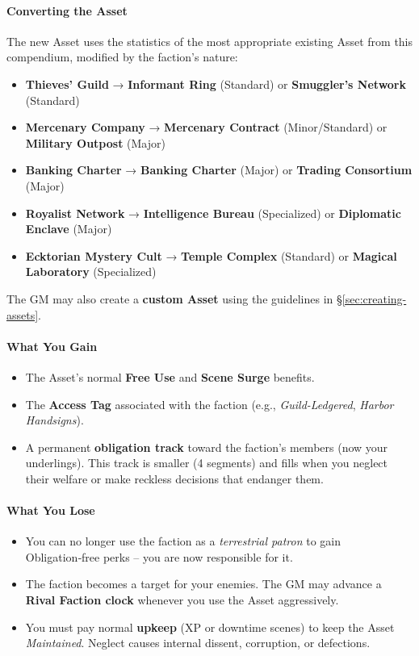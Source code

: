 \begin{tcolorbox}[colback=black!3!white,colframe=black!60!white,title={From Faction to Asset: Taking Over a Terrestrial Patron}]
\paragraph{Converting the Asset}
The new Asset uses the statistics of the most appropriate existing Asset from this compendium, modified by the faction’s nature:
\begin{itemize}
  \item \textbf{Thieves’ Guild} → \textbf{Informant Ring} (Standard) or \textbf{Smuggler’s Network} (Standard)
  \item \textbf{Mercenary Company} → \textbf{Mercenary Contract} (Minor/Standard) or \textbf{Military Outpost} (Major)
  \item \textbf{Banking Charter} → \textbf{Banking Charter} (Major) or \textbf{Trading Consortium} (Major)
  \item \textbf{Royalist Network} → \textbf{Intelligence Bureau} (Specialized) or \textbf{Diplomatic Enclave} (Major)
  \item \textbf{Ecktorian Mystery Cult} → \textbf{Temple Complex} (Standard) or \textbf{Magical Laboratory} (Specialized)
\end{itemize}
The GM may also create a \textbf{custom Asset} using the guidelines in \S\ref{sec:creating-assets}.

\paragraph{What You Gain}
\begin{itemize}
  \item The Asset’s normal \textbf{Free Use} and \textbf{Scene Surge} benefits.
  \item The \textbf{Access Tag} associated with the faction (e.g., \textit{Guild-Ledgered}, \textit{Harbor Handsigns}).
  \item A permanent \textbf{obligation track} toward the faction’s members (now your underlings). This track is smaller (4 segments) and fills when you neglect their welfare or make reckless decisions that endanger them.
\end{itemize}

\paragraph{What You Lose}
\begin{itemize}
  \item You can no longer use the faction as a \emph{terrestrial patron} to gain Obligation‑free perks – you are now responsible for it.
  \item The faction becomes a target for your enemies. The GM may advance a \textbf{Rival Faction clock} whenever you use the Asset aggressively.
  \item You must pay normal \textbf{upkeep} (XP or downtime scenes) to keep the Asset \emph{Maintained}. Neglect causes internal dissent, corruption, or defections.
\end{itemize}


\end{tcolorbox}
